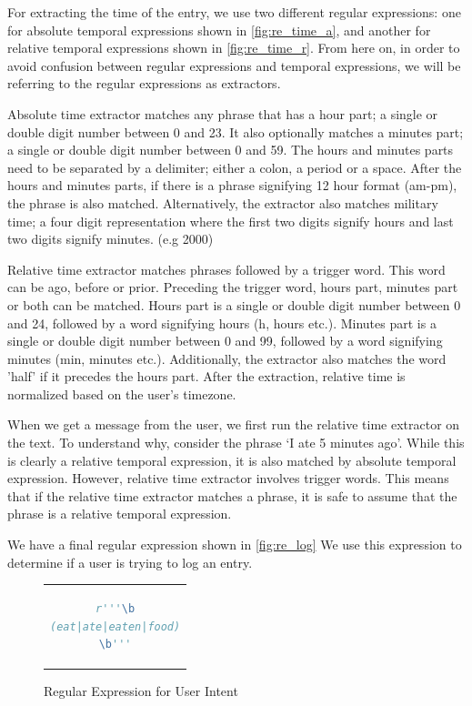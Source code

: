 For extracting the time of the entry, we use two different regular expressions: 
one for absolute temporal expressions shown in \autoref{fig:re_time_a}, and another for relative temporal expressions shown in \autoref{fig:re_time_r}.
From here on, in order to avoid confusion between regular expressions and temporal expressions, 
we will be referring to the regular expressions as extractors.

Absolute time extractor matches any phrase that has a hour part; a single or double digit number between 0 and 23.
It also optionally matches a minutes part; a single or double digit number between 0 and 59.
The hours and minutes parts need to be separated by a delimiter; either a colon, a period or a space.
After the hours and minutes parts, if there is a phrase signifying 12 hour format (am-pm), the phrase is also matched.
Alternatively, the extractor also matches military time; a four digit representation where the first two digits signify hours and last two digits signify minutes. (e.g 2000)

Relative time extractor matches phrases followed by a trigger word.
This word can be ago, before or prior.
Preceding the trigger word, hours part, minutes part or both can be matched.
Hours part is a single or double digit number between 0 and 24, followed by a word signifying hours (h, hours etc.).
Minutes part is a single or double digit number between 0 and 99, followed by a word signifying minutes (min, minutes etc.).
Additionally, the extractor also matches the word 'half' if it precedes the hours part.
After the extraction, relative time is normalized based on the user's timezone.

When we get a message from the user, we first run the relative time extractor on the text.
To understand why, consider the phrase `I ate 5 minutes ago'.
While this is clearly a relative temporal expression, it is also matched by absolute temporal expression.
However, relative time extractor involves trigger words.
This means that if the relative time extractor matches a phrase, it is safe to assume that the phrase is a relative temporal expression.

We have a final regular expression shown in \autoref{fig:re_log}
We use this expression to determine if a user is trying to log an entry.

\begin{figure}[htpb]
  \centering
  \begin{tabular}{c}
  \begin{lstlisting}[language=python]
r'''\b
(eat|ate|eaten|food)
\b'''
  \end{lstlisting}
  \end{tabular}
  \caption[Regular Expression for User Intent]{Regular Expression for User Intent}
  \label{fig:re_log}
\end{figure}

